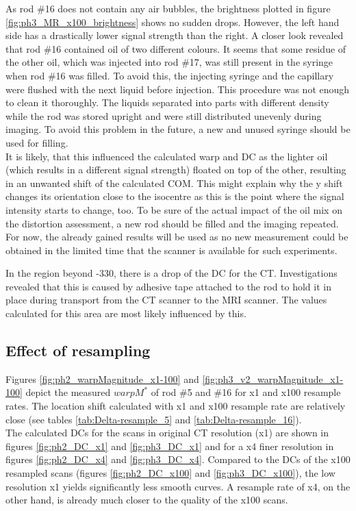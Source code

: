 As rod \#16 does not contain any air bubbles, the brightness plotted in figure \ref{fig:ph3_MR_x100_brightness} shows no sudden drops.
However, the left hand side has a drastically lower signal strength than the right.
A closer look revealed that rod \#16 contained oil of two different colours.
It seems that some residue of the other oil, which was injected into rod \#17, was still present in the syringe when rod \#16 was filled.
To avoid this, the injecting syringe and the capillary were flushed with the next liquid before injection.
This procedure was not enough to clean it thoroughly.
The liquids separated into parts with different density while the rod was stored upright and were still distributed unevenly during imaging.
To avoid this problem in the future, a new and unused syringe should be used for filling.\\

It is likely, that this influenced the calculated warp and DC as the lighter oil (which results in a different signal strength) floated on top of the other, resulting in an unwanted shift of the calculated COM.
This might explain why the y shift changes its orientation close to the isocentre as this is the point where the signal intensity starts to change, too.
To be sure of the actual impact of the oil mix on the distortion assessment, a new rod should be filled and the imaging repeated.
For now, the already gained results will be used as no new measurement could be obtained in the limited time that the scanner is available for such experiments.


In the region beyond -330, there is a drop of the DC for the CT.
Investigations revealed that this is caused by adhesive tape attached to the rod to hold it in place during transport from the CT scanner to the MRI scanner.
The values calculated for this area are most likely influenced by this.


\subsection{Effect of resampling}


Figures \ref{fig:ph2_warpMagnitude_x1-100} and \ref{fig:ph3_v2_warpMagnitude_x1-100} depict the measured $warpM^*$ of rod \#5 and \#16 for x1 and x100 resample rates.
The location shift calculated with x1 and x100 resample rate are relatively close (see tables \ref{tab:Delta-resample_5} and \ref{tab:Delta-resample_16}).\\

The calculated DCs for the scans in original CT resolution (x1) are shown in figures \ref{fig:ph2_DC_x1} and \ref{fig:ph3_DC_x1} and for a x4 finer resolution in figures \ref{fig:ph2_DC_x4} and \ref{fig:ph3_DC_x4}.
Compared to the DCs of the x100 resampled scans (figures \ref{fig:ph2_DC_x100} and \ref{fig:ph3_DC_x100}), the low resolution x1 yields significantly less smooth curves.
A resample rate of x4, on the other hand, is already much closer to the quality of the x100 scans.\\

